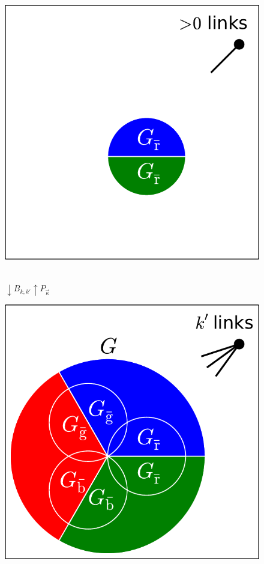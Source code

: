 \documentclass[aps, pre, onecolumn, a4paper, floatfix]{revtex4}
\begin{document}
\begin{figure}[htb]
\begin{minipage}[b]{0.6\linewidth}
\begin{center}
     \hspace{-1mm}
    \includegraphics[trim=100 0 0 0,clip,height=0.4\columnwidth]{sets_k_gc_no_1.pdf}
   \end{center}
  \end{minipage}\\
     \vspace{3mm}
      {\large \hspace{-30mm} $\downarrow B_{k,k'}$\hspace{90mm}$\uparrow P_{\vec \kappa}$ }\\
     \vspace{3mm}
  \begin{minipage}[b]{0.245\linewidth}
    \begin{center}
    \includegraphics[width=0.99\columnwidth]{sets_k_gc.pdf}
   \end{center}

\end{minipage}
\end{figure}
\end{document}
